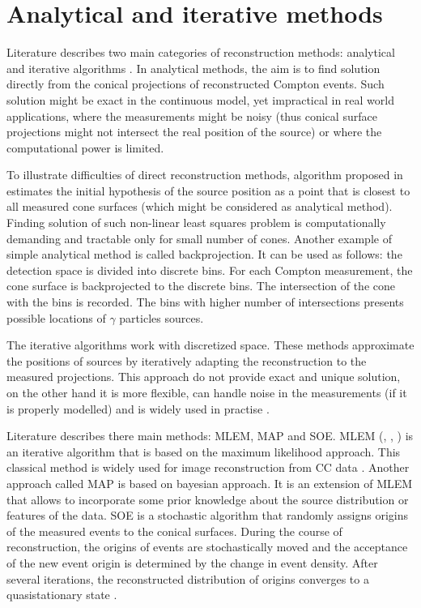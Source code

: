\section{Analytical and iterative methods}
Literature describes two main categories of reconstruction methods: analytical and iterative algorithms \cite{lojacono2}.
In analytical methods, the aim is to find solution directly from the conical projections of reconstructed Compton events.
Such solution might be exact in the continuous model, yet impractical in real world applications, where the measurements might be noisy (thus conical surface projections might not intersect the real position of the source) or where the computational power is limited.

To illustrate difficulties of direct reconstruction methods, algorithm proposed in \cite{baca2021mrs} estimates the initial hypothesis of the source position as a point that is closest to all measured cone surfaces (which might be considered as analytical method).
Finding solution of such non-linear least squares problem is computationally demanding and tractable only for small number of cones.
Another example of simple analytical method is called backprojection.
It can be used as follows:
the detection space is divided into discrete bins.
For each Compton measurement, the cone surface is backprojected to the discrete bins.
The intersection of the cone with the bins is recorded.
The bins with higher number of intersections presents possible locations of $\gamma$ particles sources.

The iterative algorithms work with discretized space.
These methods  approximate the positions of sources by iteratively adapting the reconstruction to the measured projections.
This approach do not provide exact and unique solution, on the other hand it is more flexible, can handle noise in the measurements (if it is properly modelled) and is widely used in practise \cite{lojacono2}.

Literature describes there main methods: \ac{MLEM}, \ac{MAP} and \ac{SOE}.
\ac{MLEM} (\cite{MLEM_Shepp_1982}, \cite{MLEM_Lange_Carlson_1984}, \cite{MLEM_Wilderman_2000}) is an iterative algorithm that is based on the maximum likelihood approach.
This classical method is widely used for image reconstruction from \ac{CC} data \cite{maxim2016}.
Another approach called \ac{MAP} \cite{MLEM_Lange_Carlson_1984} is based on bayesian approach.
It is an extension of \ac{MLEM} that allows to incorporate some prior knowledge about the source distribution or features of the data.
\ac{SOE} is a stochastic algorithm that randomly assigns origins of the measured events to the conical surfaces.
During the course of reconstruction, the origins of events are stochastically moved and the acceptance of the new event origin is determined by the change in event density.
After several iterations, the reconstructed distribution of origins converges to a quasistationary state \cite{SOE_Andreyev_2009}.

